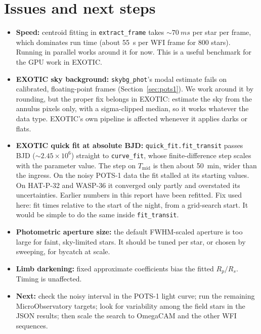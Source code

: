 \documentclass[11pt,a4paper]{article}
\begin{document}
\section{Issues and next steps}\label{sec:issues}

\begin{itemize}
  \item \textbf{Speed:} centroid fitting in \texttt{extract\_frame} takes
        ${\sim}\SI{70}{ms}$ per star per frame, which dominates run time
        (about \SI{55}{s} per WFI frame for 800 stars). Running in parallel
        works around it for now. This is a useful benchmark for the GPU
        work in EXOTIC.
  \item \textbf{EXOTIC sky background:} \texttt{skybg\_phot}'s modal
        estimate fails on calibrated, floating-point frames (Section~\ref{sec:pots1}).
        We work around it by rounding, but the proper fix belongs in
        EXOTIC: estimate the sky from the annulus pixels only, with a
        sigma-clipped median, so it works whatever the data type. EXOTIC's
        own pipeline is affected whenever it applies darks or flats.
  \item \textbf{EXOTIC quick fit at absolute BJD:} \texttt{quick\_fit.fit\_transit}
        passes BJD ($\sim2.45\times10^6$) straight to \texttt{curve\_fit},
        whose finite-difference step scales with the parameter value. The
        step on $T_\mathrm{mid}$ is then about \SI{50}{min}, wider than the
        ingress. On the noisy POTS-1 data the fit stalled at its starting
        values. On HAT-P-32 and WASP-36 it converged only partly and
        overstated its uncertainties. Earlier numbers in this report have
        been refitted. Fix used here: fit times relative to the start of
        the night, from a grid-search start. It would be simple to do the
        same inside \texttt{fit\_transit}.
  \item \textbf{Photometric aperture size:} the default FWHM-scaled aperture is too large
        for faint, sky-limited stars. It should be tuned per star, or chosen
        by sweeping, for bycatch at scale.
  \item \textbf{Limb darkening:} fixed approximate coefficients bias the
        fitted $R_p/R_s$. Timing is unaffected.
  \item \textbf{Next:} check the noisy interval in the POTS-1 light curve;
        run the remaining MicroObservatory targets; look for variability among the field stars in the JSON
        results; then scale the search to OmegaCAM and the other WFI
        sequences.
\end{itemize}
\end{document}
